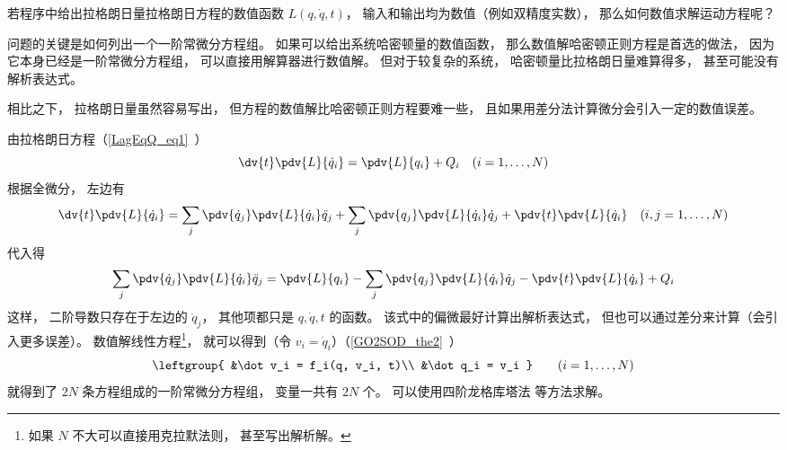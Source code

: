 
\begin{issues}
\issueDraft
\end{issues}


若程序中给出拉格朗日量拉格朗日方程的数值函数 $L(q, \dot q, t)$， 输入和输出均为数值（例如双精度实数）， 那么如何数值求解运动方程呢？

问题的关键是如何列出一个一阶常微分方程组。 如果可以给出系统哈密顿量的数值函数， 那么数值解哈密顿正则方程是首选的做法， 因为它本身已经是一阶常微分方程组， 可以直接用解算器进行数值解。 但对于较复杂的系统， 哈密顿量比拉格朗日量难算得多， 甚至可能没有解析表达式。

相比之下， 拉格朗日量虽然容易写出， 但方程的数值解比哈密顿正则方程要难一些， 且如果用差分法计算微分会引入一定的数值误差。

由拉格朗日方程（\autoref{LagEqQ_eq1}~）
\begin{equation}
\dv{t} \pdv{L}{\dot q_i} = \pdv{L}{q_i} + Q_i
\quad (i=1,\dots,N)
\end{equation}
根据全微分， 左边有
\begin{equation}
\dv{t} \pdv{L}{\dot q_i} = \sum_j\pdv{\dot q_j}\pdv{L}{\dot q_i}\ddot q_j + \sum_j\pdv{q_j}\pdv{L}{\dot q_i}\dot q_j + \pdv{t}\pdv{L}{\dot q_i} \quad (i,j=1,\dots,N)
\end{equation}
代入得
\begin{equation}
\sum_j\pdv{\dot q_j}\pdv{L}{\dot q_i}\ddot q_j = \pdv{L}{q_i} - \sum_j\pdv{q_j}\pdv{L}{\dot q_i}\dot q_j - \pdv{t}\pdv{L}{\dot q_i} + Q_i
\end{equation}
这样， 二阶导数只存在于左边的 $\ddot q_j$， 其他项都只是 $q,\dot q, t$ 的函数。 该式中的偏微最好计算出解析表达式， 但也可以通过差分来计算（会引入更多误差）。 数值解线性方程\footnote{如果 $N$ 不大可以直接用克拉默法则， 甚至写出解析解。}， 就可以得到（令 $v_i = \dot q_i$）（\autoref{GO2SOD_the2}~）
\begin{equation}
\leftgroup{
&\dot v_i = f_i(q, v_i, t)\\
&\dot q_i = v_i
}\qquad (i = 1,\dots,N)
\end{equation}
就得到了 $2N$ 条方程组成的一阶常微分方程组， 变量一共有 $2N$ 个。 可以使用四阶龙格库塔法 等方法求解。

